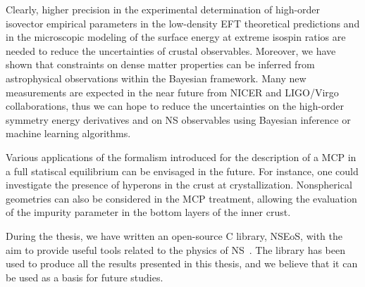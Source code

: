 Clearly, higher precision in the experimental determination of high-order
isovector empirical parameters in the low-density EFT theoretical predictions 
and in the microscopic modeling of the surface energy at extreme isospin ratios 
are needed to reduce the uncertainties of crustal observables. Moreover, 
we have shown that constraints on dense matter properties can be inferred from 
astrophysical observations within the Bayesian framework. 
Many new measurements are expected in the near future from NICER and LIGO/Virgo 
collaborations, thus we can hope to reduce the uncertainties on the 
high-order symmetry energy derivatives and on NS observables using Bayesian 
inference or machine learning algorithms.

Various applications of the formalism introduced for the description of a MCP 
in a full statiscal equilibrium can be envisaged in the future. For instance, 
one could investigate the presence of hyperons in the crust at crystallization. 
Nonspherical geometries can also be considered in the MCP treatment, allowing 
the evaluation of the impurity parameter in the bottom layers of the inner 
crust.

During the thesis, we have written an open-source C library, NSEoS, with the 
aim to provide useful tools related to the physics of NS~\cite{NSEoS}. The 
library has been used to produce all the results presented in this thesis, and 
we believe that it can be used as a basis for future studies.

